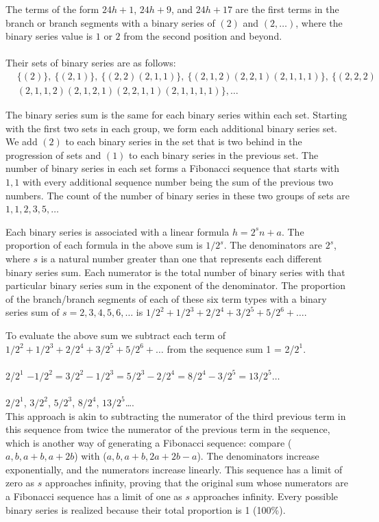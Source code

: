 \documentclass[sn-mathphys-num, pdflatex]{sn-jnl}
\begin{document}
The terms of the form $24h+1$, $24h+9$, and $24h+17$ are the first terms in the branch or branch segments with a binary series of $(2)$ and $(2,\ldots)$, where the binary series value is $1$ or $2$ from the second position and beyond. \\ \\
Their sets of binary series are as follows:
$$\begin{array}{ll} &\{(2)\},\ \{(2,1)\},\ \{(2,2) (2,1,1) \},\ \{(2,1,2) (2,2,1) (2,1,1,1) \},\  \{(2,2,2)\\ & (2,1,1,2) (2,1,2,1) (2,2,1,1) (2,1,1,1,1) \},\ldots \end{array}$$

The binary series sum is the same for each binary series within each set. Starting with the first two sets in each group, we form each additional binary series set. We add $(2)$ to each binary series in the set that is two behind in the progression of sets and $(1)$ to each binary series in the previous set. The number of binary series in each set forms a Fibonacci sequence that starts with $1,1$ with every additional sequence number being the sum of the previous two numbers. The count of the number of binary series in these two groups of sets are $1, 1, 2, 3, 5, \ldots$ 

Each binary series is associated with a linear formula $h = 2^sn+a$. The proportion of each formula in the above sum is $1/2^s$. The denominators are $2^s$, where $s$ is a natural number greater than one that represents each different binary series sum. Each numerator is the total number of binary series with that particular binary series sum in the exponent of the denominator. The proportion of the branch/branch segments of each of these six term types with a binary series sum of $s = 2,3,4,5,6, \ldots$ is $1/2^2 + 1/2^3 + 2/2^4 + 3/2^5 + 5/2^6 + \ldots$. 

To evaluate the above sum we subtract each term of $1/2^2 + 1/2^3 + 2/2^4 + 3/2^5 + 5/2^6 + \ldots$ from the sequence sum 1 = 2/$2^1$.  \\ \\
2/$2^1$ $-1/2^2=3/2^2-1/2^3=5/2^3-2/2^4=8/2^4-3/2^5=13/2^5\ldots $ \\ \\
$2/2^1$, $3/2^2$, $5/2^3$, $8/2^4$, $13/2^5$\ldots. \\

This approach is akin to subtracting the numerator of the third previous term in this sequence from twice the numerator of the previous term in the sequence, which is another way of generating a Fibonacci sequence: compare ($a, b, a+b, a+2b$) with ($a, b, a+b, 2a+2b-a$). The denominators increase exponentially, and the numerators increase linearly. This sequence has a limit of zero as $s$ approaches infinity, proving that the original sum whose numerators are a Fibonacci sequence has a limit of one as $s$ approaches infinity. Every possible binary series is realized because their total proportion is 1 (100\%).
\end{document}
